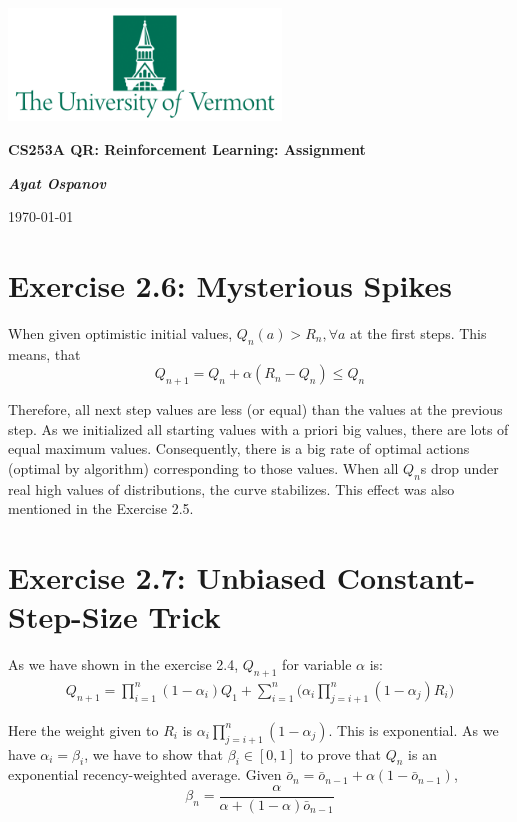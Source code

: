 \documentclass[12pt, a4paper]{article}
\begin{document}
    \begin{center}
        \includegraphics[height=3cm]{UVM.png}

        {\large\textbf{
            CS253A QR: Reinforcement Learning: Assignment 
        }}

        \vspace{0.3cm}

        \textit{\textbf{Ayat Ospanov}}

        \today
    \end{center}

    \tableofcontents
    \section{Exercise 2.6: Mysterious Spikes}
        When given optimistic initial values, $Q_n(a) > R_n, \forall a$ at the first steps. This means, that
        $$Q_{n+1} = Q_n + \alpha(R_n - Q_n) \leq Q_n$$

        Therefore, all next step values are less (or equal) than the values at the previous step. As we
        initialized all starting values with a priori big values, there are lots of equal maximum values.
        Consequently, there is a big rate of optimal actions (optimal by algorithm) corresponding to those values.
        When all $Q_n$s drop under real high values of distributions, the curve stabilizes. This effect was also
        mentioned in the Exercise 2.5.



    \section{Exercise 2.7: Unbiased Constant-Step-Size Trick}
        As we have shown in the exercise 2.4, $Q_{n+1}$ for variable $\alpha$ is:
        \begin{align*}
            Q_{n+1} = \prod_{i=1}^n(1-\alpha_i)Q_1 + \sum_{i=1}^n\Big(\alpha_i \prod_{j=i+1}^n(1-\alpha_j)R_i\Big)
        \end{align*}

        Here the weight given to $R_i$ is $\alpha_i \prod_{j=i+1}^n(1-\alpha_j)$. This is exponential.
        As we have $\alpha_i = \beta_i$, we have to show that $\beta_i \in [0, 1]$ to prove that $Q_n$ is
        an exponential recency-weighted average. Given $\bar{o}_{n} = \bar{o}_{n-1} + \alpha (1 - \bar{o}_{n-1})$,
        $$\beta_n = \frac{\alpha}{\alpha + (1 - \alpha) \bar{o}_{n-1}}$$
\end{document}
